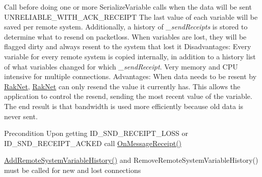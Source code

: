 Call before doing one or more Serialize\-Variable calls when the data will be sent U\-N\-R\-E\-L\-I\-A\-B\-L\-E\-\_\-\-W\-I\-T\-H\-\_\-\-A\-C\-K\-\_\-\-R\-E\-C\-E\-I\-P\-T The last value of each variable will be saved per remote system. Additionally, a history of {\itshape \-\_\-send\-Receipts} is stored to determine what to resend on packetloss. When variables are lost, they will be flagged dirty and always resent to the system that lost it Disadvantages\-: Every variable for every remote system is copied internally, in addition to a history list of what variables changed for which {\itshape \-\_\-send\-Receipt}. Very memory and C\-P\-U intensive for multiple connections. Advantages\-: When data needs to be resent by \hyperlink{namespace_rak_net}{Rak\-Net}, \hyperlink{namespace_rak_net}{Rak\-Net} can only resend the value it currently has. This allows the application to control the resend, sending the most recent value of the variable. The end result is that bandwidth is used more efficiently because old data is never sent. 

\begin{DoxyPrecond}{Precondition}
Upon getting I\-D\-\_\-\-S\-N\-D\-\_\-\-R\-E\-C\-E\-I\-P\-T\-\_\-\-L\-O\-S\-S or I\-D\-\_\-\-S\-N\-D\-\_\-\-R\-E\-C\-E\-I\-P\-T\-\_\-\-A\-C\-K\-E\-D call \hyperlink{class_rak_net_1_1_variable_delta_serializer_a55fc78fe99dae4f7727fa190429ec255}{On\-Message\-Receipt()} 

\hyperlink{class_rak_net_1_1_variable_delta_serializer_a36242a91f3fd4891d20b804792b60daf}{Add\-Remote\-System\-Variable\-History()} and Remove\-Remote\-System\-Variable\-History() must be called for new and lost connections 
\end{DoxyPrecond}

